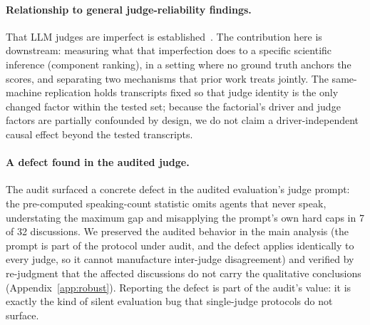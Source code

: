 \paragraph{Relationship to general judge-reliability findings.}
That LLM judges are imperfect is established~\cite{reliability2026,
allverdicts2026}. The contribution here is downstream: measuring what
that imperfection does to a specific scientific inference (component
ranking), in a setting where no ground truth anchors the scores, and
separating two mechanisms that prior work treats jointly. The
same-machine replication holds transcripts fixed so that judge identity
is the only changed factor within the tested set; because the
factorial's driver and judge factors are partially confounded by
design, we do not claim a driver-independent causal effect beyond the
tested transcripts.

\paragraph{A defect found in the audited judge.}
The audit surfaced a concrete defect in the audited evaluation's judge
prompt: the pre-computed speaking-count statistic omits agents that
never speak, understating the maximum gap and misapplying the prompt's
own hard caps in 7 of 32 discussions. We preserved the audited behavior
in the main analysis (the prompt is part of the protocol under audit,
and the defect applies identically to every judge, so it cannot
manufacture inter-judge disagreement) and verified by re-judgment that
the affected discussions do not carry the qualitative conclusions
(Appendix~\ref{app:robust}). Reporting the defect is part of the audit's
value: it is exactly the kind of silent evaluation bug that
single-judge protocols do not surface.
